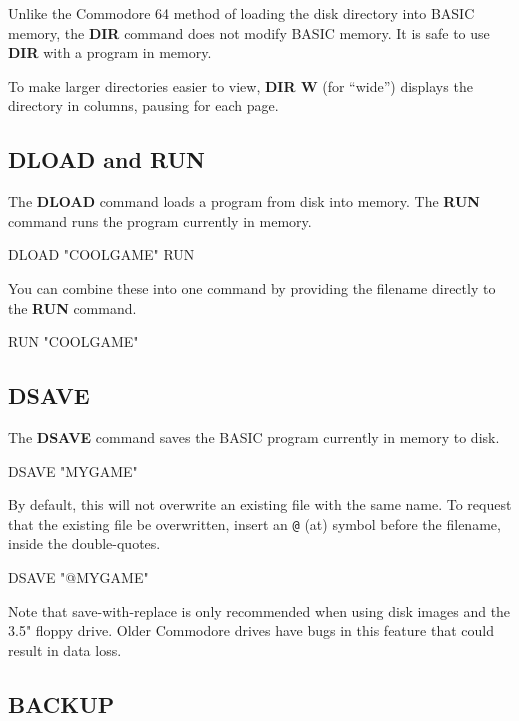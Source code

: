 Unlike the Commodore 64 method of loading the disk directory into BASIC memory, the {\bf DIR} command does not modify BASIC memory. It is safe to use {\bf DIR} with a program in memory.

To make larger directories easier to view, {\bf DIR W} (for ``wide'') displays the directory in columns, pausing for each page.

\subsection{DLOAD and RUN}

The {\bf DLOAD} command loads a program from disk into memory. The {\bf RUN} command runs the program currently in memory.

\begin{screenoutput}
DLOAD "COOLGAME"
RUN
\end{screenoutput}

You can combine these into one command by providing the filename directly to the {\bf RUN} command.

\begin{screenoutput}
RUN "COOLGAME"
\end{screenoutput}

\subsection{DSAVE}

The {\bf DSAVE} command saves the BASIC program currently in memory to disk.

\begin{screenoutput}
DSAVE "MYGAME"
\end{screenoutput}

By default, this will not overwrite an existing file with the same name. To request that the existing file be overwritten, insert an {\tt @} (at) symbol before the filename, inside the double-quotes.

\begin{screenoutput}
DSAVE "@MYGAME"
\end{screenoutput}

Note that save-with-replace is only recommended when using disk images and the 3.5" floppy drive. Older Commodore drives have bugs in this feature that could result in data loss.

\subsection{BACKUP}

